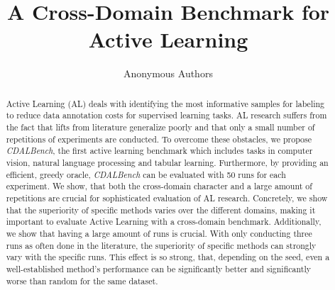 \documentclass[]{article}
\title{A Cross-Domain Benchmark for Active Learning}
\author{%
	Anonymous Authors
}
\begin{document}
	


\maketitle


\begin{abstract}

Active Learning (AL) deals with identifying the most informative samples for
labeling to reduce data annotation costs for supervised learning tasks. AL
research suffers from the fact that lifts from literature generalize poorly and
that only a small number of repetitions of experiments are conducted. To overcome
these obstacles, we propose \emph{CDALBench}, the first active learning benchmark
which includes tasks in computer vision, natural language processing and tabular
learning. Furthermore, by providing an efficient, greedy oracle, \emph{CDALBench}
can be evaluated with 50 runs for each experiment. We show, that both the
cross-domain character and a large amount of repetitions are crucial for
sophisticated evaluation of AL research. Concretely, we show that the
superiority of specific methods varies over the different domains, making it
important to evaluate Active Learning with a cross-domain benchmark.
Additionally, we show that having a large amount of runs is crucial. With only
conducting three runs as often done in the literature, the superiority of
specific methods can strongly vary with the specific runs. This effect is so strong, that, depending on the seed, even a well-established method's performance can be significantly better and significantly
worse than random for the same dataset. 
\end{abstract}

\end{document}
